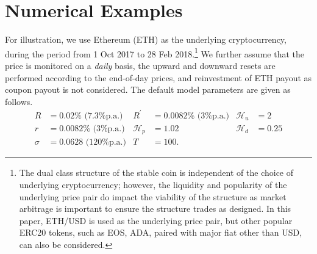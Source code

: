 \documentclass[draft, noinfoline]{ectaart}
\numberwithin{equation}{section}
\theoremstyle{plain}
\newcommand{\Ap}{A\ensuremath{^\prime}~}
\newcommand{\Bp}{B\ensuremath{^\prime}~}
\begin{document}




\section{Numerical Examples}\label{sect:numerical}

For illustration, we use Ethereum (ETH) as the underlying cryptocurrency, during the period from 1 Oct 2017 to 28 Feb 2018.\footnote{The dual class structure of the stable coin is independent of the choice of underlying cryptocurrency; however, the liquidity and popularity of the underlying price pair do impact the viability of the structure as market arbitrage is important to ensure the structure trades as designed. In this paper, ETH/USD is used as the underlying price pair, but other popular ERC20 tokens, such as EOS, ADA, paired with major fiat other than USD, can also be considered.} We further assume that the price is monitored on a \emph{daily} basis, the upward and downward resets are performed according to the end-of-day prices, and reinvestment of ETH payout as coupon payout is not considered. The default model parameters are given as follows.
\begin{align*}
R& =0.02\% \text{ (7.3\% p.a.)} & R^\prime & = 0.0082\% \text{ (3\% p.a.)} &\mathcal{H}_{u} & =2\\
r&=0.0082\% \text{ (3\% p.a.)}  & \mathcal{H}_{p} & =1.02 & \mathcal{H}_{d} & =0.25 \\
\sigma &= 0.0628 \text{ (120\% p.a.)}& T &= 100 .
\end{align*}
\end{document}
